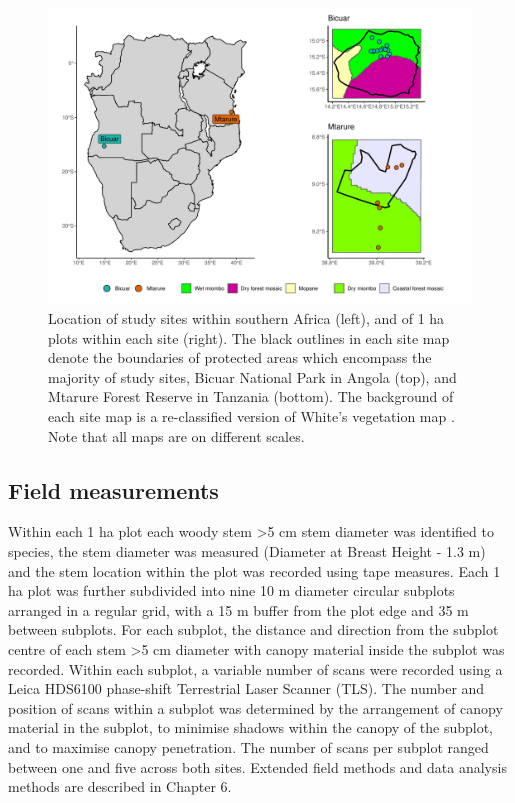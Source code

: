 \documentclass[11pt,a4paper]{article}
\begin{document}
\begin{figure}
	\includegraphics[width=\linewidth]{map}
	\caption{Location of study sites within southern Africa (left), and of 1 ha plots within each site (right). The black outlines in each site map denote the boundaries of protected areas which encompass the majority of study sites, Bicuar National Park in Angola (top), and Mtarure Forest Reserve in Tanzania (bottom). The background of each site map is a re-classified version of White's vegetation map \citep{White1983}. Note that all maps are on different scales.}
	\label{map}
\end{figure}

\subsection{Field measurements}

Within each 1 ha plot each woody stem >5 cm stem diameter was identified to species, the stem diameter was measured (Diameter at Breast Height - 1.3 m) and the stem location within the plot was recorded using tape measures. Each 1 ha plot was further subdivided into nine 10 m diameter circular subplots arranged in a regular grid, with a 15 m buffer from the plot edge and 35 m between subplots. For each subplot, the distance and direction from the subplot centre of each stem >5 cm diameter with canopy material inside the subplot was recorded. Within each subplot, a variable number of scans were recorded using a Leica HDS6100 phase-shift Terrestrial Laser Scanner (TLS). The number and position of scans within a subplot was determined by the arrangement of canopy material in the subplot, to minimise shadows within the canopy of the subplot, and to maximise canopy penetration. The number of scans per subplot ranged between one and five across both sites. Extended field methods and data analysis methods are described in Chapter 6.
\end{document}
